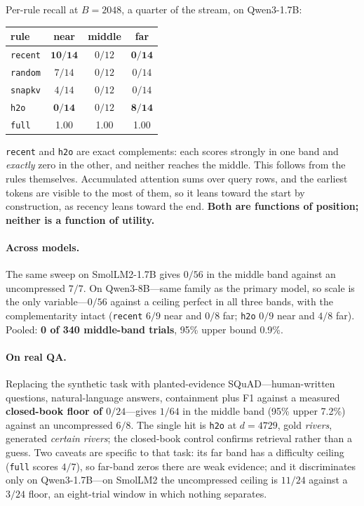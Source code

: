 \documentclass[10pt]{article}
\begin{document}
Per-rule recall at $B{=}2048$, a quarter of the stream, on Qwen3-1.7B:

\begin{table}[h]\centering\small
\begin{tabular}{lccc}
\toprule
rule & near & middle & far \\
\midrule
\texttt{recent} & $\mathbf{10/14}$ & $0/12$ & $\mathbf{0/14}$ \\
\texttt{random} & $7/14$ & $0/12$ & $0/14$ \\
\texttt{snapkv} & $4/14$ & $0/12$ & $0/14$ \\
\texttt{h2o}    & $\mathbf{0/14}$ & $0/12$ & $\mathbf{8/14}$ \\
\texttt{full}   & 1.00 & 1.00 & 1.00 \\
\bottomrule
\end{tabular}
\end{table}

\texttt{recent} and \texttt{h2o} are exact complements: each scores strongly in
one band and \emph{exactly} zero in the other, and neither reaches the middle.
This follows from the rules themselves. Accumulated attention sums over query
rows, and the earliest tokens are visible to the most of them, so it leans
toward the start by construction, as recency leans toward the end.
\textbf{Both are functions of position; neither is a function of utility.}

\paragraph{Across models.} The same sweep on SmolLM2-1.7B gives $0/56$ in the
middle band against an uncompressed $7/7$. On Qwen3-8B---same family as the
primary model, so scale is the only variable---$0/56$ against a ceiling perfect
in all three bands, with the complementarity intact (\texttt{recent} $6/9$ near
and $0/8$ far; \texttt{h2o} $0/9$ near and $4/8$ far). Pooled: \textbf{0 of 340
middle-band trials}, 95\% upper bound 0.9\%.

\paragraph{On real QA.} Replacing the synthetic task with planted-evidence
SQuAD---human-written questions, natural-language answers, containment plus F1
against a measured \textbf{closed-book floor of $0/24$}---gives $1/64$ in the
middle band (95\% upper 7.2\%) against an uncompressed $6/8$. The single hit is
\texttt{h2o} at $d{=}4729$, gold \emph{rivers}, generated \emph{certain
rivers}; the closed-book control confirms retrieval rather than a guess. Two
caveats are specific to that task: its far band has a difficulty ceiling
(\texttt{full} scores $4/7$), so far-band zeros there are weak evidence; and it
discriminates only on Qwen3-1.7B---on SmolLM2 the uncompressed ceiling is
$11/24$ against a $3/24$ floor, an eight-trial window in which nothing
separates.
\end{document}
